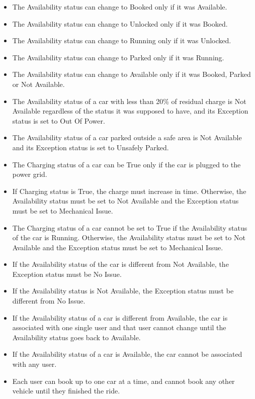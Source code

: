 \documentclass[11pt]{article} %
\begin{document}
\begin{itemize}
	\item The Availability status can change to Booked only if it was Available.
	\item The Availability status can change to Unlocked only if it was Booked.
	\item The Availability status can change to Running only if it was Unlocked.
	\item The Availability status can change to Parked only if it was Running.
	\item  The Availability status can change to Available only if it was Booked, Parked or Not Available.
	\item The Availability status of a car with less than 20\% of residual charge is Not Available regardless of the status it was supposed to have, and its Exception status is set to Out Of Power.
	\item The Availability status of a car parked outside a safe area is Not Available and its Exception status is set to Unsafely Parked.
	\item The Charging status of a car can be True only if the car is plugged to the power grid.
	\item If Charging status is True, the charge must increase in time. Otherwise, the Availability status must be set to Not Available and the Exception status must be set to Mechanical Issue. 
	\item The Charging status of a car cannot be set to True if the Availability status of the car is Running. Otherwise, the Availability status must be set to Not Available and the Exception status must be set to Mechanical Issue. 
	\item If the Availability status of the car is different from Not Available, the Exception status must be No Issue.
	\item If the Availability status is Not Available, the Exception status must be different from No Issue.
	\item If the Availability status of a car is different from Available, the car is associated with one single user and that user cannot change until the Availability status goes back to Available.
	\item If the Availability status of a car is Available, the car cannot be associated with any user.
	\item Each user can book up to one car at a time, and cannot book any other vehicle until they finished the ride.
\end{itemize}
	
\end{document}
